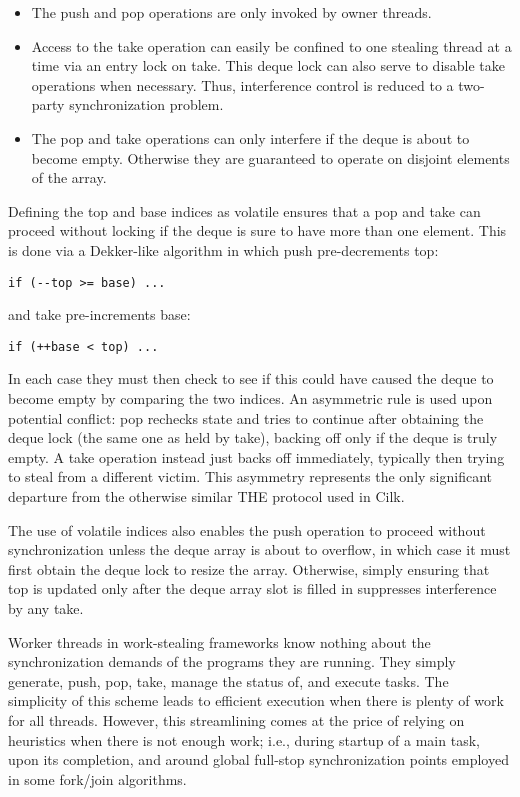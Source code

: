 \begin{itemize}
\item The push and pop operations are only invoked by owner threads.
\item Access to the take operation can easily be confined to one
  stealing thread at a time via an entry lock on take. This deque lock
  can also serve to disable take operations when necessary. Thus,
  interference control is reduced to a two-party synchronization
  problem.
\item The pop and take operations can only interfere if the deque is
  about to become empty. Otherwise they are guaranteed to operate on
  disjoint elements of the array.
\end{itemize}

Defining the top and base indices as volatile ensures that a pop and
take can proceed without locking if the deque is sure to have more
than one element. This is done via a Dekker-like algorithm in which
push pre-decrements top:

\begin{lstlisting}
if (--top >= base) ...
\end{lstlisting}

and take pre-increments base:

\begin{lstlisting}
if (++base < top) ...
\end{lstlisting}

In each case they must then check to see if this could have caused the
deque to become empty by comparing the two indices. An asymmetric rule
is used upon potential conflict: pop rechecks state and tries to
continue after obtaining the deque lock (the same one as held by
take), backing off only if the deque is truly empty. A take operation
instead just backs off immediately, typically then trying to steal
from a different victim. This asymmetry represents the only
significant departure from the otherwise similar THE protocol used in
Cilk.

The use of volatile indices also enables the push operation to proceed
without synchronization unless the deque array is about to overflow,
in which case it must first obtain the deque lock to resize the
array. Otherwise, simply ensuring that top is updated only after the
deque array slot is filled in suppresses interference by any take.


Worker threads in work-stealing frameworks know nothing about the
synchronization demands of the programs they are running. They simply
generate, push, pop, take, manage the status of, and execute
tasks. The simplicity of this scheme leads to efficient execution when
there is plenty of work for all threads. However, this streamlining
comes at the price of relying on heuristics when there is not enough
work; i.e., during startup of a main task, upon its completion, and
around global full-stop synchronization points employed in some
fork/join algorithms.

